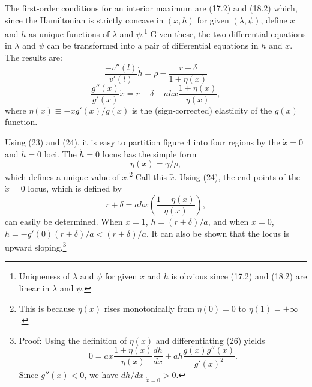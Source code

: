 \documentclass[11pt,fleqn]{article}
\begin{document}
The first-order conditions for an interior maximum are (17.2) and (18.2) which, since the Hamiltonian is strictly concave in $(x, h)$ for given $(\lambda, \psi)$, define $x$ and $h$ as unique functions of $\lambda$ and $\psi$.\footnote{Uniqueness of $\lambda$ and $\psi$ for given $x$ and $h$ is obvious since (17.2) and (18.2) are linear in $\lambda$ and $\psi$.} Given these, the two differential equations in $\lambda$ and $\psi$ can be transformed into a pair of differential equations in $h$ and $x$. The results are:
\begin{equation}
\frac{-v''(l)}{v'(l)} \dot{h} = \rho - \frac{r + \delta}{1 + \eta(x)}
\end{equation}
\begin{equation}
\frac{g''(x)}{g'(x)} \dot{x} = r + \delta - ahx \frac{1 + \eta(x)}{\eta(x)},
\end{equation}
where $\eta(x) \equiv -xg'(x)/g(x)$ is the (sign-corrected) elasticity of the $g(x)$ function.

Using (23) and (24), it is easy to partition figure 4 into four regions by the $\dot{x} = 0$ and $\dot{h} = 0$ loci. The $\dot{h} = 0$ locus has the simple form
\begin{equation}
\eta(x) = \gamma/\rho,
\end{equation}
which defines a unique value of $x$.\footnote{This is because $\eta(x)$ rises monotonically from $\eta(0) = 0$ to $\eta(1) = +\infty$.} Call this $\hat{x}$. Using (24), the end points of the $\dot{x} = 0$ locus, which is defined by
\begin{equation}
r + \delta = ahx \left( \frac{1 + \eta(x)}{\eta(x)} \right),
\end{equation}
can easily be determined. When $x = 1$, $h = (r + \delta)/a$, and when $x = 0$, $h = -g'(0)(r + \delta)/a < (r + \delta)/a$. It can also be shown that the locus is upward sloping.\footnote{Proof: Using the definition of $\eta(x)$ and differentiating (26) yields
\[
0 = ax \frac{1 + \eta(x)}{\eta(x)} \frac{dh}{dx} + ah \frac{g(x)g''(x)}{g'(x)^2}.
\]
Since $g''(x) < 0$, we have $dh/dx |_{\dot{x}=0} > 0$.}
\end{document}
